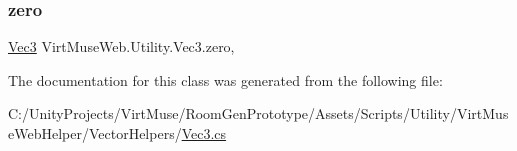 \mbox{\label{class_virt_muse_web_1_1_utility_1_1_vec3_ae139740d1aaa9f8b23cee75dbab10cb8}} 
\subsubsection{\texorpdfstring{zero}{zero}}
{\footnotesize\ttfamily \mbox{\hyperlink{class_virt_muse_web_1_1_utility_1_1_vec3}{Vec3}} Virt\+Muse\+Web.\+Utility.\+Vec3.\+zero\hspace{0.3cm}{\ttfamily [static]}, {\ttfamily [get]}}



The documentation for this class was generated from the following file\+:\begin{DoxyCompactItemize}
\item 
C\+:/\+Unity\+Projects/\+Virt\+Muse/\+Room\+Gen\+Prototype/\+Assets/\+Scripts/\+Utility/\+Virt\+Muse\+Web\+Helper/\+Vector\+Helpers/\mbox{\hyperlink{_vec3_8cs}{Vec3.\+cs}}\end{DoxyCompactItemize}
